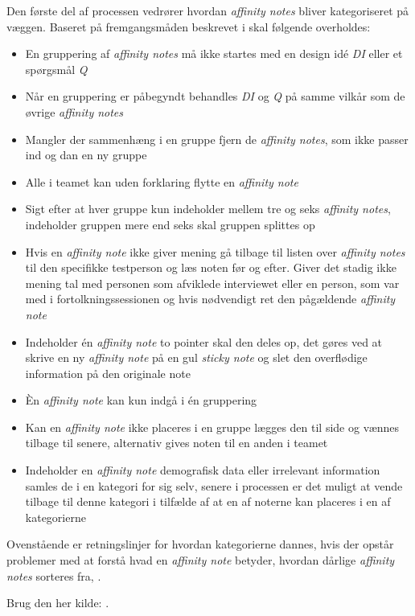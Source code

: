 Den første del af processen vedrører hvordan \textit{affinity notes} bliver kategoriseret på væggen. Baseret på fremgangsmåden beskrevet i \textcite[ss. 166-168]{Book:BuildingAnAffinity} skal følgende overholdes: \blankline
%
\begin{itemize}
  \item En gruppering af \textit{affinity notes} må ikke startes med en design idé \textit{DI} eller et spørgsmål \textit{Q}
  \item Når en gruppering er påbegyndt behandles \textit{DI} og \textit{Q} på samme vilkår som de øvrige \textit{affinity notes}
  \item Mangler der sammenhæng i en gruppe fjern de \textit{affinity notes}, som ikke passer ind og dan en ny gruppe
  \item Alle i teamet kan uden forklaring flytte en \textit{affinity note}
  \item Sigt efter at hver gruppe kun indeholder mellem tre og seks \textit{affinity notes}, indeholder gruppen mere end seks skal gruppen splittes op
  \item Hvis en \textit{affinity note} ikke giver mening gå tilbage til listen over \textit{affinity notes} til den specifikke testperson og læs noten før og efter. Giver det stadig ikke mening tal med personen som afviklede interviewet eller en person, som var med i fortolkningssessionen og hvis nødvendigt ret den pågældende \textit{affinity note}
  \item Indeholder én \textit{affinity note} to pointer skal den deles op, det gøres ved at skrive en ny \textit{affinity note} på en gul \textit{sticky note} og slet den overflødige information på den originale note
  \item Èn \textit{affinity note} kan kun indgå i én gruppering
  \item Kan en \textit{affinity note} ikke placeres i en gruppe lægges den til side og vænnes tilbage til senere, alternativ gives noten til en anden i teamet
  \item Indeholder en \textit{affinity note} demografisk data eller irrelevant information samles de i en kategori for sig selv, senere i processen er det muligt at vende tilbage til denne kategori i tilfælde af at en af noterne kan placeres i en af kategorierne \blankline
\end{itemize}
%
Ovenstående er retningslinjer for hvordan kategorierne dannes, hvis der opstår problemer med at forstå hvad en \textit{affinity note} betyder, hvordan dårlige \textit{affinity notes} sorteres fra, \parencite[ss. 166-168]{Book:BuildingAnAffinity}.
        



    






  


Brug den her kilde: \textcite[ss. 24-28]{PDF:ConsolidationIdeationAffinity}. 


